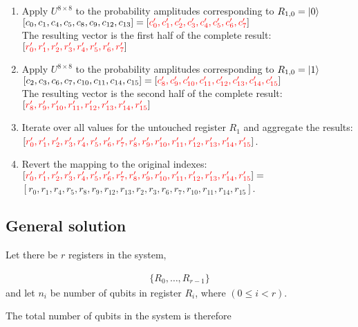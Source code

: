 \begin{enumerate}
    \item Apply $U^{8\times{}8}$ to the probability amplitudes corresponding to $R_{1,0} = \ket{0}$\\
    $[c_0,c_1,c_4,c_5,c_8,c_9,c_{12},c_{13}] = [\color{red}c'_0,c'_1,c'_2,c'_3,c'_4,c'_5,c'_6,c'_7\color{black}]$\\
    The resulting vector is the first half of the complete result:\\
    $[\color{red}r'_0,r'_1,r'_2,r'_3,r'_4,r'_5,r'_6,r'_7\color{black}]$
    \item Apply $U^{8\times{}8}$ to the probability amplitudes corresponding to $R_{1,0} = \ket{1}$\\
    $[c_2,c_3,c_6,c_7,c_{10},c_{11},c_{14},c_{15}] = [\color{red}c'_8,c'_9,c'_{10},c'_{11},c'_{12},c'_{13},c'_{14},c'_{15}\color{black}]$\\
    The resulting vector is the second half of the complete result:\\
    $[\color{red}r'_8,r'_9,r'_{10},r'_{11},r'_{12},r'_{13},r'_{14},r'_{15}\color{black}]$
    \item Iterate over all values for the untouched register $R_1$ and aggregate the results:\\
     $[\color{red}r'_0,r'_1,r'_2,r'_3,r'_4,r'_5,r'_6,r'_7,r'_8,r'_9,r'_{10},r'_{11},r'_{12},r'_{13},r'_{14},r'_{15}\color{black}]$.
    \item Revert the mapping to the original indexes:\\ $[\color{red}r'_0,r'_1,r'_2,r'_3,r'_4,r'_5,r'_6,r'_7,r'_8,r'_9,r'_{10},r'_{11},r'_{12},r'_{13},r'_{14},r'_{15}\color{black}] =$\\
    $[r_0,r_1,r_4,r_5,r_8,r_9,r_{12},r_{13},r_2,r_3,r_6,r_7,r_{10},r_{11},r_{14},r_{15}]$.
\end{enumerate}

\subsection{General solution}

Let there be $r$ registers in the system, 

\begin{align*}
\{R_0, \dots{}, R_{r-1}\}
\end{align*}
and let $n_i$ be number of qubits in register $R_i$, where $(0\leq{}i<r)$.

The total number of qubits in the system is therefore

